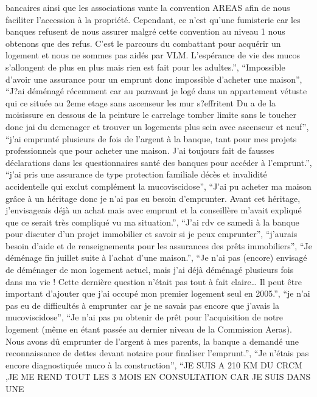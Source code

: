 \documentclass[
  letterpaper,
  DIV=11,
  numbers=noendperiod]{scrartcl}
\begin{document}
\begin{itemize}
  bancaires ainsi que les associations vante la convention AREAS afin de
  nous faciliter l'accession à la propriété. Cependant, ce n'est qu'une
  fumisterie car les banques refusent de nous assurer malgré cette
  convention au niveau 1 nous obtenons que des refus. C'est le parcours
  du combattant pour acquérir un logement et nous ne sommes pas aidés
  par VLM. L'espérance de vie des mucos s'allongent de plus en plus mais
  rien est fait pour les adultes.'', ``Impossible d'avoir une assurance
  pour un emprunt donc impossible d'acheter une maison'', ``J?ai
  déménagé récemment car au paravant je logé dans un appartement vétuste
  qui ce située au 2eme etage sans ascenseur les mur s?effritent Du a de
  la moisissure en dessous de la peinture le carrelage tomber limite
  sans le toucher donc jai du demenager et trouver un logements plus
  sein avec ascenseur et neuf'', ``j'ai emprunté plusieurs de fois de
  l'argent à la banque, tant pour mes projets professionnels que pour
  acheter une maison. J'ai toujours fait de fausses déclarations dans
  les questionnaires santé des banques pour accéder à l'emprunt.'',
  ``j'ai pris une assurance de type protection familiale décès et
  invalidité accidentelle qui exclut complément la mucoviscidose'',
  ``J'ai pu acheter ma maison grâce à un héritage donc je n'ai pas eu
  besoin d'emprunter. Avant cet héritage, j'envisageais déjà un achat
  mais avec emprunt et la conseillère m'avait expliqué que ce serait
  très compliqué vu ma situation.'', ``J'ai rdv ce samedi à la banque
  pour discuter d'un projet immobilier et savoir si je peux emprunter'',
  ``j'aurais besoin d'aide et de renseignements pour les assurances des
  prêts immobiliers'', ``Je déménage fin juillet suite à l'achat d'une
  maison.'', ``Je n'ai pas (encore) envisagé de déménager de mon
  logement actuel, mais j'ai déjà déménagé plusieurs fois dans ma vie !
  Cette dernière question n'était pas tout à fait claire\ldots{} Il peut
  être important d'ajouter que j'ai occupé mon premier logement seul en
  2005.'', ``je n'ai pas eu de difficultés à emprunter car je ne savais
  pas encore que j'avais la mucoviscidose'', ``Je n'ai pas pu obtenir de
  prêt pour l'acquisition de notre logement (même en étant passée au
  dernier niveau de la Commission Aeras). Nous avons dû emprunter de
  l'argent à mes parents, la banque a demandé une reconnaissance de
  dettes devant notaire pour finaliser l'emprunt.'', ``Je n'étais pas
  encore diagnostiquée muco à la construction'', ``JE SUIS A 210 KM DU
  CRCM ,JE ME REND TOUT LES 3 MOIS EN CONSULTATION CAR JE SUIS DANS UNE

\end{itemize}
\end{document}
